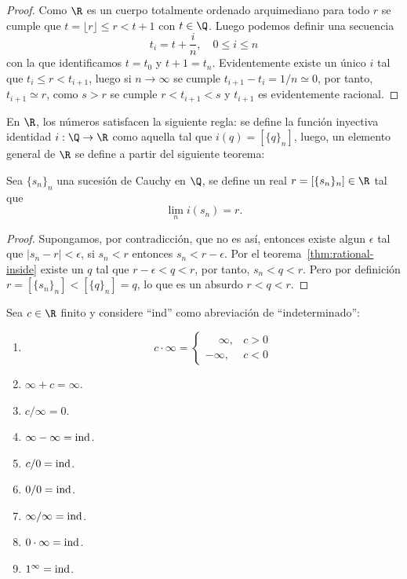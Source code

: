 \documentclass[11pt,oneside,a4paper]{book}
\begin{document}
\begin{proof}
Como $\R$ es un cuerpo totalmente ordenado arquimediano para todo $r$ se cumple que $t=\lfloor r\rfloor\leq r\lt t+1$ con $t\in\Q$. Luego podemos definir una secuencia
$$t_i=t+\frac{i}{n},\quad 0\leq i\leq n$$
con la que identificamos $t=t_0$ y $t+1=t_n$. Evidentemente existe un único $i$ tal que $t_i\leq r\lt t_{i+1}$, luego si $n\to\infty$ se cumple $t_{i+1}-t_i=1/n\simeq 0$, por tanto, $t_{i+1}\simeq r$, como $s\gt r$ se cumple $r\lt t_{i+1}\lt s$ y $t_{i+1}$ es evidentemente racional.
\end{proof}
En $\R$, los números satisfacen la siguiente regla: se define la función inyectiva identidad $i:\Q\rightarrow\R$ como aquella tal que $i(q)=[\{q\}_n]$, luego, un elemento general de $\R$ se define a partir del siguiente teorema:
\begin{thm}
Sea $\{s_n\}_n$ una sucesión de Cauchy en $\Q$, se define un real $r=[\{s_n\}_n]\in\R$ tal que
$$\lim_n i(s_n)=r.$$
\end{thm}
\begin{proof}
Supongamos, por contradicción, que no es así, entonces existe algun $\epsilon$ tal que $|s_n-r|\lt\epsilon$, si $s_n\lt r$ entonces $s_n\lt r-\epsilon$. Por el teorema~\ref{thm:rational-inside} existe un $q$ tal que $r-\epsilon\lt q\lt r$, por tanto, $s_n\lt q\lt r$. Pero por definición $r=[\{s_n\}_n]\lt[\{q\}_n]=q$, lo que es un absurdo $r\lt q\lt r$.
\end{proof}
\begin{thm}
Sea $c\in\R$ finito y considere ``ind'' como abreviación de ``indeterminado'':
\begin{enumerate}[$a$)]
\item $$c\cdot\infty=\begin{cases}
\phantom{-}\infty, &c\gt 0\\
-\infty, &c\lt 0
\end{cases}$$
\item $\infty+c=\infty$.
\item $c/\infty=0$.
\item $\infty-\infty=\rm ind$.
\item $c/0=\rm ind$.
\item $0/0=\rm ind$.
\item $\infty/\infty=\rm ind$.
\item $0\cdot\infty=\rm ind$.
\item $1^\infty=\rm ind$.
\end{enumerate}
\end{thm}
\end{document}
